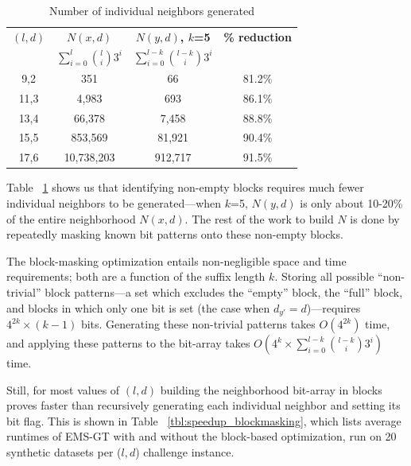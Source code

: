\documentclass[conference]{IEEEtran}
\begin{document}
\begin{enumerate}[label={\em \arabic*.}]
			\begin{table}[h] %
				\renewcommand{\arraystretch}{1.3}
				\caption{Number of individual neighbors generated}
				\label{tbl:neighbors_blockmasking}
				\centering
				\begin{tabular}{|c|c|c|c|}
				\hline 
				\bfseries\boldmath $(l,d)$ & \bfseries\boldmath $N(x,d)$ & \bfseries\boldmath $N(y,d)$, $k$=5 & \bfseries \% reduction\\
				\bfseries & \bfseries\boldmath $\sum_{i=0}^{l} \binom{l}{i} 3^{i}$ & \bfseries\boldmath $\sum_{i=0}^{l-k} \binom{l-k}{i} 3^{i}$ & \\
				\hline
				 9,2 &         351  &       66 & 81.2\%\\
				11,3 &       4,983  &      693 & 86.1\%\\
				13,4 &      66,378  &    7,458 & 88.8\%\\
				15,5 &     853,569  &   81,921 & 90.4\%\\
				17,6 &  10,738,203  &  912,717 & 91.5\%\\
				\hline\end{tabular}
				\end{table}

			Table ~\ref{tbl:neighbors_blockmasking} shows us that identifying non-empty blocks requires much fewer individual neighbors to be generated---when $k$=5, $N(y,d)$ is only about 10-20\% of the entire neighborhood $N(x,d)$. The rest of the work to build $N$ is done by repeatedly masking known bit patterns onto these non-empty blocks. \newline

			The block-masking optimization entails non-negligible space and time requirements; both are a function of the suffix length $k$. Storing all possible ``non-trivial'' block patterns---a set which excludes the ``empty'' block, the ``full'' block, and blocks in which only one bit is set (the case when $d_{y'} = d$)---requires $4^{2k}\times (k-1)$ bits. Generating these non-trivial patterns takes $O(4^{2k})$ time, and applying these patterns to the bit-array takes $O(4^{k} \times \sum_{i=0}^{l-k} \binom{l-k}{i} 3^{i})$ time. \newline

			Still, for most values of $(l,d)$ building the neighborhood bit-array in blocks proves faster than recursively generating each individual neighbor and setting its bit flag. This is shown in Table ~\ref{tbl:speedup_blockmasking}, which lists average runtimes of EMS-GT with and without the block-based optimization, run on 20 synthetic datasets per ($l,d$) challenge instance.\newline


\end{enumerate}
\end{document}
